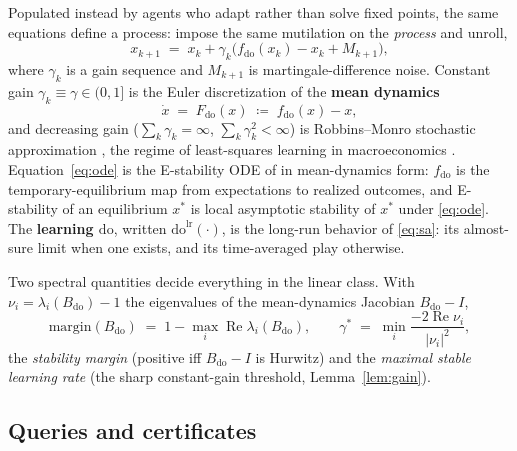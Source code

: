 \documentclass[pmlr]{jmlr}
\newcommand{\doop}{\mathrm{do}}
\newcommand{\dolr}[1]{\doop^{\mathrm{lr}}(#1)}
\newcommand{\margin}{\mathrm{margin}}
\newcommand{\gstar}{\gamma^{*}}
\begin{document}
Populated instead by agents who adapt rather than solve fixed points, the same equations define
a process: impose the same mutilation on the \emph{process} and unroll,
\begin{equation}\label{eq:sa}
x_{k+1} \;=\; x_k + \gamma_k \bigl( f_{\doop}(x_k) - x_k + M_{k+1} \bigr),
\end{equation}
where $\gamma_k$ is a gain sequence and $M_{k+1}$ is martingale-difference noise. Constant gain
$\gamma_k \equiv \gamma \in (0,1]$ is the Euler discretization of the \textbf{mean dynamics}
\begin{equation}\label{eq:ode}
\dot{x} \;=\; F_{\doop}(x) \;\coloneqq\; f_{\doop}(x) - x,
\end{equation}
and decreasing gain ($\sum_k \gamma_k = \infty$, $\sum_k \gamma_k^2 < \infty$) is Robbins--Monro
stochastic approximation \citep{robbins1951stochastic}, the regime of least-squares learning in
macroeconomics \citep{marcet1989convergence,evans2001learning}. Equation~\eqref{eq:ode} is the
E-stability ODE of \citet{evans2001learning} in mean-dynamics form: $f_{\doop}$ is the
temporary-equilibrium map from expectations to realized outcomes, and E-stability of an
equilibrium $x^*$ is local asymptotic stability of $x^*$ under \eqref{eq:ode}. The
\textbf{learning $\doop$}, written $\dolr{\cdot}$, is the long-run behavior of \eqref{eq:sa}: its
almost-sure limit when one exists, and its time-averaged play otherwise.

Two spectral quantities decide everything in the linear class. With
$\nu_i = \lambda_i(B_{\doop}) - 1$ the eigenvalues of the mean-dynamics Jacobian
$B_{\doop} - I$,
\begin{equation}\label{eq:margin}
\margin(B_{\doop}) \;=\; 1 - \max_i \operatorname{Re} \lambda_i(B_{\doop}),
\qquad
\gstar \;=\; \min_i \frac{-2\operatorname{Re}\nu_i}{|\nu_i|^2},
\end{equation}
the \emph{stability margin} (positive iff $B_{\doop}-I$ is Hurwitz) and the \emph{maximal stable
learning rate} (the sharp constant-gain threshold, Lemma~\ref{lem:gain}).

\subsection{Queries and certificates}\label{sec:queries}
\end{document}
